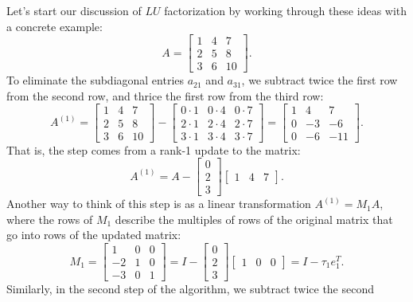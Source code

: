 \documentclass[12pt, leqno]{article}
\begin{document}
Let's start our discussion of $LU$ factorization by working through
these ideas with a concrete example:
\[
  A =
  \begin{bmatrix}
    1 & 4 & 7 \\
    2 & 5 & 8 \\
    3 & 6 & 10
  \end{bmatrix}.
\]
To eliminate the subdiagonal entries $a_{21}$ and $a_{31}$, we
subtract twice the first row from the second row, and thrice the
first row from the third row:
\[
  A^{(1)} =
  \begin{bmatrix}
    1 & 4 & 7 \\
    2 & 5 & 8 \\
    3 & 6 & 10
  \end{bmatrix} -
  \begin{bmatrix}
    0 \cdot 1 & 0 \cdot 4 & 0 \cdot 7 \\
    2 \cdot 1 & 2 \cdot 4 & 2 \cdot 7 \\
    3 \cdot 1 & 3 \cdot 4 & 3 \cdot 7
  \end{bmatrix}
  =
  \begin{bmatrix}
    1 &  4 &  7 \\
    0 & -3 & -6 \\
    0 & -6 & -11
  \end{bmatrix}.
\]
That is, the step comes from a rank-1 update to the matrix:
\[
  A^{(1)} =
  A -
  \begin{bmatrix} 0 \\ 2 \\ 3 \end{bmatrix}
  \begin{bmatrix} 1 & 4 & 7 \end{bmatrix}.
\]
Another way to think of this step is as a linear transformation
$A^{(1)} = M_1 A$, where the rows of $M_1$ describe the multiples
of rows of the original matrix that go into rows of the updated matrix:
\[
  M_1 = \begin{bmatrix} 1 & 0 & 0 \\ -2 & 1 & 0 \\ -3 & 0 & 1 \end{bmatrix}
      = I - \begin{bmatrix} 0 \\ 2 \\ 3 \end{bmatrix}
            \begin{bmatrix} 1 & 0 & 0 \end{bmatrix}
      = I - \tau_1 e_1^T.
\]
Similarly, in the second step of the algorithm, we subtract twice the second
\end{document}
